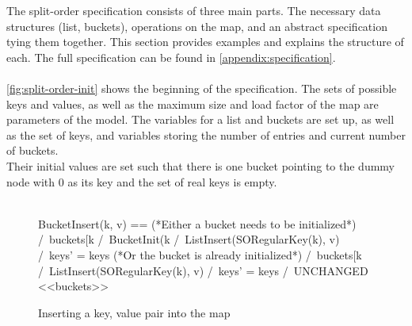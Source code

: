 \documentclass{uit-thesis}
\begin{document}
The split-order specification consists of three main parts. The necessary data structures (list, buckets), operations on the map, and an abstract specification tying them together. This section provides examples and explains the structure of each. The full specification can be found in \autoref{appendix:specification}.
\\\\
\autoref{fig:split-order-init} shows the beginning of the specification. The sets of possible keys and values, as well as the maximum size and load factor of the map are parameters of the model. The variables for a list and buckets are set up, as well as the set of keys, and variables storing the number of entries and current number of buckets.\\
Their initial values are set such that there is one bucket pointing to the dummy node with 0 as its key and the set of real keys is empty.
\\\\
\begin{figure}
    \begin{tla}
        BucketInsert(k, v) ==
                    (*Either a bucket needs to be initialized*)
                    \/  /\ buckets[k %
                        /\ BucketInit(k %
                        /\ ListInsert(SORegularKey(k), v)
                        /\ keys' = keys                       
                      (*Or the bucket is already initialized*)
                    \/  /\ buckets[k %
                        /\ ListInsert(SORegularKey(k), v)
                        /\ keys' = keys 
                        /\ UNCHANGED <<buckets>>
    \end{tla}
\begin{tlatex}
%
%
%
\@xx{}%
%
%
%
%
%
\@xx{}%
%
%
%
\end{tlatex}
\caption{Inserting a key, value pair into the map}
\label{fig:bucket-insert}
\end{figure}
\end{document}
